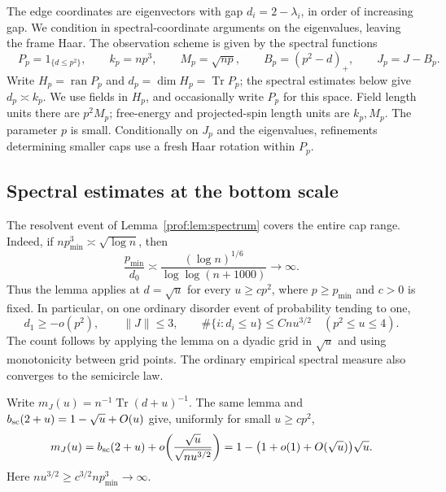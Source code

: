 The edge coordinates are eigenvectors with gap \(d_i=2-\lambda_i\), in order
of increasing gap. We condition in spectral-coordinate arguments on the
eigenvalues, leaving the frame Haar. The observation scheme is given by the
spectral functions
\begin{equation}
\label{cap:edge-definitions}\quad P_p=1_{\{d \le p^2\}},\qquad k_p=np^3,\qquad M_p=\sqrt{np},
 \qquad B_p=(p^2-d)_+,\qquad J_p=J-B_p .
\end{equation}
Write \(H_p=\operatorname{ran}P_p\) and \(d_p=\dim H_p=\operatorname{Tr}P_p\);
the spectral estimates below give \(d_p\asymp k_p\). We use fields in
\(H_p\), and occasionally write \(P_p\) for this space. Field length
units there are \(p^2 M_p\); free-energy and projected-spin length units are
\(k_p,M_p\). The parameter \(p\) is small. Conditionally on \(J_p\) and the
eigenvalues, refinements determining smaller caps use a fresh Haar rotation
within \(P_p\).

\subsection{Spectral estimates at the bottom scale}

The resolvent event of Lemma~\ref{prof:lem:spectrum} covers the entire
cap range. Indeed, if $np_{\min}^3\asymp\sqrt{\log n}$, then
\[
 \frac{p_{\min}}{d_0}\asymp
 \frac{(\log n)^{1/6}}{\log\log(n+1000)}\longrightarrow\infty.
\]
Thus the lemma applies at $d=\sqrt u$ for every $u\ge c p^2$, where
$p\ge p_{\min}$ and $c>0$ is fixed. In particular, on one ordinary
disorder event of probability tending to one,
\[
 d_1\ge-o(p^2),\qquad \|J\|\le3,
 \qquad \#\{i:d_i\le u\}\le Cnu^{3/2}\quad(p^2\le u\le4).
\]
The count follows by applying the lemma on a dyadic grid in $\sqrt u$
and using monotonicity between grid points. The ordinary empirical
spectral measure also converges to the semicircle law.

Write $m_J(u)=n^{-1}\operatorname{Tr}(d+u)^{-1}$. The same lemma and
$b_{\rm sc}(2+u)=1-\sqrt u+O(u)$ give, uniformly for small
$u\ge cp^2$,
\[
 m_J(u)=b_{\rm sc}(2+u)
       +o\!\left(\frac{\sqrt u}{\sqrt{nu^{3/2}}}\right)
 =1-\bigl(1+o(1)+O(\sqrt u)\bigr)\sqrt u.
\]
Here $nu^{3/2}\ge c^{3/2}np_{\min}^3\to\infty$.

